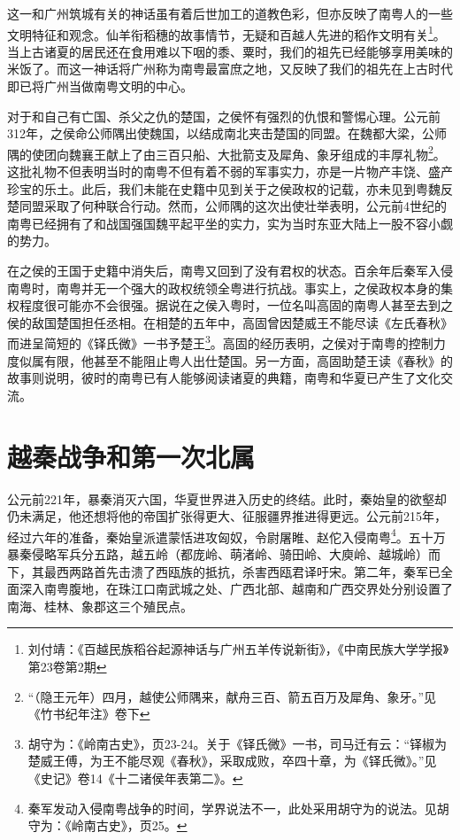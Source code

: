 这一和广州筑城有关的神话虽有着后世加工的道教色彩，但亦反映了南粤人的一些文明特征和观念。仙羊衔稻穗的故事情节，无疑和百越人先进的稻作文明有关\footnote{刘付靖：《百越民族稻谷起源神话与广州五羊传说新街》，《中南民族大学学报》第23卷第2期}。当上古诸夏的居民还在食用难以下咽的黍、粟时，我们的祖先已经能够享用美味的米饭了。而这一神话将广州称为南粤最富庶之地，又反映了我们的祖先在上古时代即已将广州当做南粤文明的中心。

对于和自己有亡国、杀父之仇的楚国，之侯怀有强烈的仇恨和警惕心理。公元前312年，之侯命公师隅出使魏国，以结成南北夹击楚国的同盟。在魏都大梁，公师隅的使团向魏襄王献上了由三百只船、大批箭支及犀角、象牙组成的丰厚礼物\footnote{“（隐王元年）四月，越使公师隅来，献舟三百、箭五百万及犀角、象牙。”见《竹书纪年注》卷下}。这批礼物不但表明当时的南粤不但有着不弱的军事实力，亦是一片物产丰饶、盛产珍宝的乐土。此后，我们未能在史籍中见到关于之侯政权的记载，亦未见到粤魏反楚同盟采取了何种联合行动。然而，公师隅的这次出使壮举表明，公元前4世纪的南粤已经拥有了和战国强国魏平起平坐的实力，实为当时东亚大陆上一股不容小觑的势力。

在之侯的王国于史籍中消失后，南粤又回到了没有君权的状态。百余年后秦军入侵南粤时，南粤并无一个强大的政权统领全粤进行抗战。事实上，之侯政权本身的集权程度很可能亦不会很强。据说在之侯入粤时，一位名叫高固的南粤人甚至去到之侯的敌国楚国担任丞相。在相楚的五年中，高固曾因楚威王不能尽读《左氏春秋》而进呈简短的《铎氏微》一书予楚王\footnote{胡守为：《岭南古史》，页23-24。关于《铎氏微》一书，司马迁有云：“铎椒为楚威王傅，为王不能尽观《春秋》，采取成败，卒四十章，为《铎氏微》。”见《史记》卷14《十二诸侯年表第二》。}。高固的经历表明，之侯对于南粤的控制力度似属有限，他甚至不能阻止粤人出仕楚国。另一方面，高固助楚王读《春秋》的故事则说明，彼时的南粤已有人能够阅读诸夏的典籍，南粤和华夏已产生了文化交流。

\section{越秦战争和第一次北属}


公元前221年，暴秦消灭六国，华夏世界进入历史的终结。此时，秦始皇的欲壑却仍未满足，他还想将他的帝国扩张得更大、征服疆界推进得更远。公元前215年，经过六年的准备，秦始皇派遣蒙恬进攻匈奴，令尉屠睢、赵佗入侵南粤\footnote{秦军发动入侵南粤战争的时间，学界说法不一，此处采用胡守为的说法。见胡守为：《岭南古史》，页25。}。五十万暴秦侵略军兵分五路，越五岭（都庞岭、萌渚岭、骑田岭、大庾岭、越城岭）而下，其最西两路首先击溃了西瓯族的抵抗，杀害西瓯君译吁宋。第二年，秦军已全面深入南粤腹地，在珠江口南武城之处、广西北部、越南和广西交界处分别设置了南海、桂林、象郡这三个殖民点。

